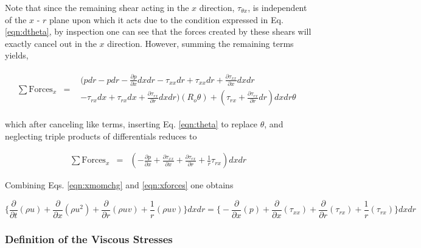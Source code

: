 	Note that since the remaining shear acting in the $x$ direction, $\tau_{\theta x}$, is independent of the $x$ - $r$
plane upon which it acts due to the condition expressed in Eq. \ref{eqn:dtheta}, by inspection one can see that the forces
created by these shears will exactly cancel out in the $x$ direction.  However, summing the remaining terms yields,

\begin{displaymath}
	\begin{array}{ccc}
	\sum \textrm{Forces}_x & = &
		\begin{array}{c}
			(pdr - pdr - \frac{\partial p}{\partial x}dxdr - \tau_{xx}dr + \tau_{xx}dr + \frac{\partial \tau_{xx}}
			{\partial x}dxdr \\
			- \tau_{rx}dx + \tau_{rx}dx + \frac{\partial \tau_{rx}}{\partial r}dxdr)(R_o \theta)
			+ (\tau_{rx} + \frac{\partial \tau_{rx}}{\partial r}dr)dxdr \theta
		\end{array}
	\end{array}
\end{displaymath}

	which after canceling like terms, inserting Eq. \ref{eqn:theta} to replace $\theta$, and neglecting 
triple products of differentials reduces to

\begin{equation}
	\begin{array}{ccc}
	\sum \textrm{Forces}_x & = &
		(- \frac{\partial p}{\partial x} + \frac{\partial \tau_{xx}}{\partial x}
		+ \frac{\partial \tau_{rx}}{\partial r} + \frac{1}{r}\tau_{rx})dxdr
	\end{array}
\label{eqn:xforces}
\end{equation}

	Combining Eqs. \ref{eqn:xmomchg} and \ref{eqn:xforces} one obtains

\begin{equation}
\Big\{\frac{\partial}{\partial t}(\rho u) + \frac{\partial}{\partial x}(\rho u^2) +
\frac{\partial}{\partial r}(\rho uv) + \frac{1}{r}(\rho u v)\Big\}dxdr = \Big\{ - \frac{\partial}{\partial x}(p) 
+ \frac{\partial}{\partial x}(\tau_{xx}) + \frac{\partial}{\partial r}(\tau_{rx}) + \frac{1}{r}(\tau_{rx})\Big\}dxdr
\label{eqn:xmomshear}
\end{equation}

\subsubsection{Definition of the Viscous Stresses}

